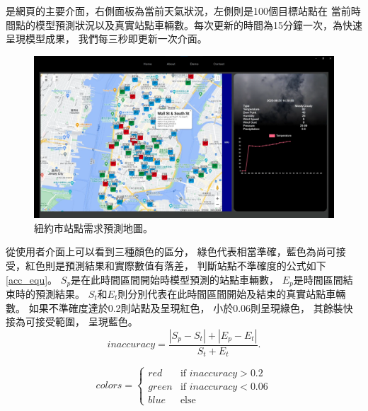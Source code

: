 \documentclass[a4paper,14pt]{extarticle}
\begin{document}
            是網頁的主要介面，右側面板為當前天氣狀況，左側則是100個目標站點在
            當前時間點的模型預測狀況以及真實站點車輛數。每次更新的時間為15分鐘一次，為快速呈現模型成果，
            我們每三秒即更新一次介面。
            \begin{figure}[htb]
                \centering
                \includegraphics[width=\textwidth]{nstc_adjust_image.png}
                \caption{
                    {\fontsize{12pt}{10pt}\selectfont
                        紐約市站點需求預測地圖。
                    }
                }
                \label{fig:web-view}
            \end{figure}
            從使用者介面上可以看到三種顏色的區分，
            綠色代表相當準確，藍色為尚可接受，紅色則是預測結果和實際數值有落差，
            判斷站點不準確度的公式如下 \ref{acc_equ}。
            $S_p$是在此時間區間開始時模型預測的站點車輛數，
            $E_p$是時間區間結束時的預測結果。
            $S_t$和$E_t$則分別代表在此時間區間開始及結束的真實站點車輛數。
            如果不準確度達於0.2則站點及呈現紅色，
            小於0.06則呈現綠色，
            其餘裝快接為可接受範圍，
            呈現藍色。
            \begin{equation}
            \label{acc_equ}
            \text{$inaccuracy$} = \frac{|S_p-S_t|+|E_p-E_t|}{S_t+E_t}.
            \end{equation}

            \[
            colors =
            \begin{cases}
            red & \text{if $inaccuracy>0.2$} \\
            green & \text{if $inaccuracy<0.06$} \\
            blue & \text{else} 
            \end{cases}
            \]
\end{document}
